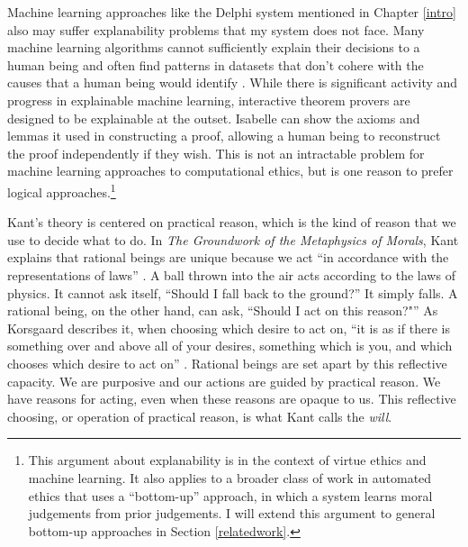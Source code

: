 \begin{isabellebody}
\begin{isamarkuptext}
Machine learning approaches like the Delphi system \citep{delphi} mentioned in Chapter \ref{intro} also may suffer explanability 
problems that my system does not face. Many machine learning algorithms cannot sufficiently explain their 
decisions to a human being and often find patterns in datasets that don't 
cohere with the causes that a human being would identify \citep{puiutta}. While there is significant activity 
and progress in explainable machine learning, interactive theorem provers are designed to be explainable 
at the outset. Isabelle can show the axioms and lemmas it used in constructing a proof, 
allowing a human being to reconstruct the proof independently if they wish. This is not an 
intractable problem for machine learning approaches to computational ethics, but is one reason to 
prefer logical approaches.\footnote{This argument about explanability is in the context of virtue ethics and 
machine learning. It also applies to a broader class of work in automated ethics 
that uses a ``bottom-up'' approach, in which a system learns moral judgements from prior judgements. 
I will extend this argument to general bottom-up approaches in Section \ref{relatedwork}.}%
\end{isamarkuptext}\isamarkuptrue%
%
\isadelimdocument
%
\endisadelimdocument
%
\isatagdocument
%
\isamarkuptrue%
%
\endisatagdocument
{\isafolddocument}%
%
\isadelimdocument
%
\endisadelimdocument
%
\begin{isamarkuptext}%
Kant's theory is centered on practical reason, which is the kind of reason that we 
use to decide what to do. In \emph{The Groundwork of the Metaphysics of Morals}, Kant explains that 
rational beings are unique because we act ``in accordance with 
the representations of laws'' \citep[26]{groundwork}. A ball thrown into the air acts 
according to the laws of physics. It cannot ask itself, ``Should I fall back to the ground?'' 
It simply falls. A rational being, on the other hand, can ask, ``Should I act on this reason?"''
As Korsgaard describes it, when choosing which desire to act on, ``it is as if there is something over 
and above all of your desires, something which is you, and which chooses which desire to act on'' \citep[100]{sources}. 
Rational beings are set apart by this reflective capacity. We are purposive and 
our actions are guided by practical reason. We have reasons for acting, even when these reasons are
opaque to us. This reflective choosing, or operation of practical reason, is what Kant calls the \emph{will}. 


\end{isamarkuptext}
\end{isabellebody}
